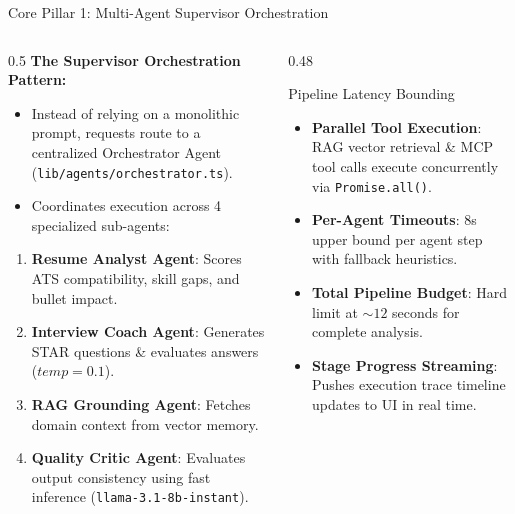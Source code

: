 \documentclass[aspectratio=169, 10pt]{beamer}
\begin{document}
\begin{frame}{Core Pillar 1: Multi-Agent Supervisor Orchestration}
  \begin{columns}
    \begin{column}{0.5\textwidth}
      \textbf{The Supervisor Orchestration Pattern:}
      \begin{itemize}
        \item Instead of relying on a monolithic prompt, requests route to a centralized \alert{Orchestrator Agent} (\texttt{lib/agents/orchestrator.ts}).
        \item Coordinates execution across 4 specialized sub-agents:
      \end{itemize}
      
      \vspace{0.2cm}
      \small
      \begin{enumerate}
        \item \textbf{Resume Analyst Agent}: Scores ATS compatibility, skill gaps, and bullet impact.
        \item \textbf{Interview Coach Agent}: Generates STAR questions \& evaluates answers ($temp=0.1$).
        \item \textbf{RAG Grounding Agent}: Fetches domain context from vector memory.
        \item \textbf{Quality Critic Agent}: Evaluates output consistency using fast inference (\texttt{llama-3.1-8b-instant}).
      \end{enumerate}
    \end{column}

    \begin{column}{0.48\textwidth}
      \begin{block}{Pipeline Latency Bounding}
        \small
        \begin{itemize}
          \item \textbf{Parallel Tool Execution}: RAG vector retrieval \& MCP tool calls execute concurrently via \texttt{Promise.all()}.
          \item \textbf{Per-Agent Timeouts}: 8s upper bound per agent step with fallback heuristics.
          \item \textbf{Total Pipeline Budget}: Hard limit at $\sim 12$ seconds for complete analysis.
          \item \textbf{Stage Progress Streaming}: Pushes execution trace timeline updates to UI in real time.
        \end{itemize}
      \end{block}
    \end{column}
  \end{columns}
\end{frame}
\end{document}
